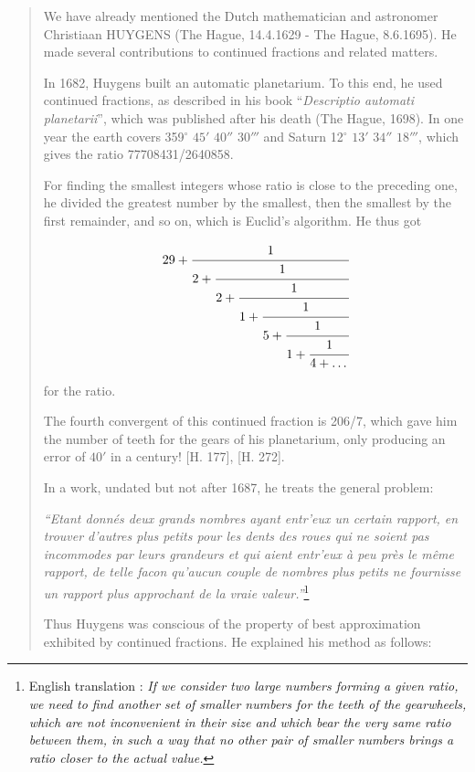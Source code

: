 \begin{quote}
We have already mentioned the Dutch mathematician and astronomer
Christiaan HUYGENS  (The Hague, 14.4.1629 - The Hague, 8.6.1695).
He made several contributions to continued fractions and related
matters.

In 1682, Huygens built an automatic planetarium.  To this end,
he used continued fractions, as described in his book
``\emph{Descriptio automati planetarii}'', which was published
after his death (The Hague, 1698).  In one year the earth
covers 359$^{\circ}$ $45'$ $40''$ $30'''$ and Saturn 12$^{\circ}$
$13'$ $34''$ $18'''$, which gives the ratio 77708431/2640858.

For finding the smallest integers whose ratio is close to the preceding
one, he divided the greatest number by the smallest, then the smallest
by the first remainder, and so on, which is Euclid's algorithm.
He thus got

\begin{equation}
29 + \cfrac{1}{2 + \cfrac{1}{2 + \cfrac{1}{1 + 
\cfrac{1}{5 + \cfrac{1}{1 + \cfrac{1}{4 + \ldots{}}}}}}}
\nonumber
\end{equation}

for the ratio.

The fourth convergent of this continued fraction is 206/7, which
gave him the number of teeth for the gears of his planetarium, only
producing an error of $40'$ in a century! [H. 177], [H. 272].

In a work, undated but not after 1687, he treats the general problem:

\emph{``Etant donn\'es deux grands nombres ayant entr'eux un
certain rapport, en trouver d'autres plus petits pour les dents 
des roues qui ne soient pas incommodes par leurs grandeurs et qui 
aient entr'eux \`a peu pr\`es le m\^eme rapport,
de telle facon qu'aucun couple de nombres plus petits ne 
fournisse un rapport plus approchant de la vraie 
valeur.''}\footnote{English translation 
\cite{bibref:i:sandrinederaspide}:
\emph{If we consider two large numbers forming a given ratio,
we need to find another set of smaller numbers for the teeth of the gearwheels, 
which are not inconvenient in their size and which bear the very same ratio 
between them, in such a way that no other pair of smaller numbers 
brings a ratio closer to the actual value.}}

Thus Huygens was conscious of the property of best approximation
exhibited by continued fractions.  He explained his method
as follows:


\end{quote}
